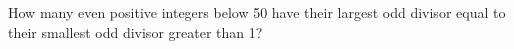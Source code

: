 How many even positive integers below 50 have their largest odd divisor equal to their smallest odd divisor greater than 1?
